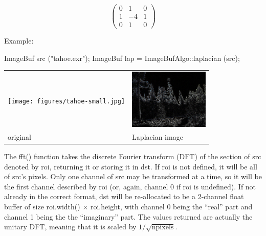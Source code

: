 \[ \left( \begin{array}{ccc}
0 &  1 & 0 \\
1 & -4 & 1 \\
0 &  1 & 0 \end{array} \right)\]

\smallskip
\noindent Example:
\begin{code}
    ImageBuf src ("tahoe.exr");
    ImageBuf lap = ImageBufAlgo::laplacian (src);
\end{code}

\spc \begin{tabular}{ll}
\texttt{[image: figures/tahoe-small.jpg]} &
\includegraphics[width=1.5in]{figures/tahoe-laplacian.jpg} \\
original & Laplacian image \\
\end{tabular}
\apiend


 
 

The {\cf fft()} function takes the discrete Fourier transform (DFT) of
the section of {\cf src} denoted by {\cf roi}, returning it or storing it in {\cf dst}.
If {\cf roi} is not defined, it will be all of {\cf src}'s pixels.  Only
one channel of {\cf src} may be transformed at a time, so it will be the
first channel described by {\cf roi} (or, again, channel 0 if {\cf roi}
is undefined).  If not already in the correct format, {\cf dst} will be
re-allocated to be a 2-channel {\cf float} buffer of size
{\cf roi.width()} $\times$ {\cf roi.height}, with channel 0 being the
``real'' part and channel 1 being the the ``imaginary'' part.  The
values returned are actually the unitary DFT, meaning that it is scaled
by $1/\sqrt{\mathrm{npixels}}$.

